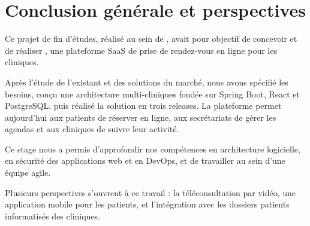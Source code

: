 \chapter*{Conclusion générale et perspectives}


Ce projet de fin d'études, réalisé au sein de \entreprise, avait pour objectif de concevoir et de réaliser \nomprojet, une plateforme SaaS de prise de rendez-vous en ligne pour les cliniques.

Après l'étude de l'existant et des solutions du marché, nous avons spécifié les besoins, conçu une architecture multi-cliniques fondée sur Spring Boot, React et PostgreSQL, puis réalisé la solution en trois releases. La plateforme permet aujourd'hui aux patients de réserver en ligne, aux secrétariats de gérer les agendas et aux cliniques de suivre leur activité. 

Ce stage nous a permis d'approfondir nos compétences en architecture logicielle, en sécurité des applications web et en DevOps, et de travailler au sein d'une équipe agile.

Plusieurs perspectives s'ouvrent à ce travail : la téléconsultation par vidéo, une application mobile pour les patients, et l'intégration avec les dossiers patients informatisés des cliniques.
